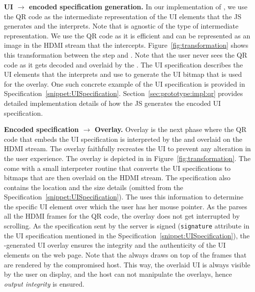 % 


\begin{mylist}
\item \textbf{UI $\rightarrow$ encoded specification generation.} In our implementation of \name, we use the QR code as the intermediate representation of the UI elements that the \name JS generates and the \device interprets. Note that \name is agnostic of the type of intermediate representation. We use the QR code as it is efficient and can be represented as an image in the HDMI stream that the \device intercepts. Figure~\ref{fig:transformation} shows this transformation between the step \one and \two. Note that the user never sees the QR code as it gets decoded and overlaid by the \device. The UI specification describes the UI elements that the \device interprets and use to generate the UI bitmap that is used for the overlay. One such concrete example of the UI specification is provided in Specification~\ref{snippet:UISpecification}. Section~\ref{sec:prototype:impl:qr} provides detailed implementation details of how the \name JS generates the encoded UI specification. 

\item \textbf{Encoded specification $\rightarrow$ Overlay.} Overlay is the next phase where the QR code that embeds the UI specification is interpreted by the \device and overlaid on the HDMI stream. The overlay faithfully recreates the UI to prevent any alteration in the user experience. The \device overlay is depicted in \three in Figure~\ref{fig:transformation}. The \device come with a small interpreter routine that converts the UI specifications to bitmaps that are then overlaid on the HDMI stream. The specification also contains the location and the size details (omitted from the Specification~\ref{snippet:UISpecification}). The \device uses this information to determine the specific UI element over which the user has her mouse pointer. As the \device parses all the HDMI frames for the QR code, the overlay does not get interrupted by scrolling. As the specification sent by the server is signed (\texttt{signature} attribute in the UI specification mentioned in the Specification~\ref{snippet:UISpecification}), the \device-generated UI overlay ensures the integrity and the authenticity of the UI elements on the web page. Note that the \device always draws on top of the frames that are rendered by the compromised host. This way, the overlaid UI is always visible by the user on display, and the host can not manipulate the overlays, hence \emph{output integrity} is ensured.

\end{mylist}

